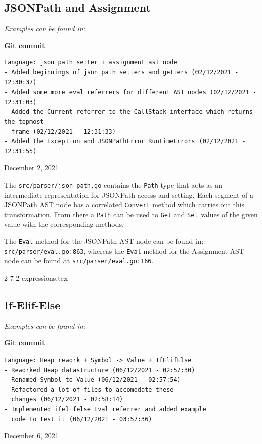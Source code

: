 \documentclass[]{full}
\theoremstyle{definition}
\begin{document}
\subsection{JSONPath and Assignment}

\textit{Examples can be found in: }

\begin{center}
    \textbf{Git commit}
    \begin{verbatim}
Language: json path setter + assignment ast node
- Added beginnings of json path setters and getters (02/12/2021 - 12:30:37)
- Added some more eval referrers for different AST nodes (02/12/2021 - 12:31:03)
- Added the Current referrer to the CallStack interface which returns the topmost
  frame (02/12/2021 - 12:31:33)
- Added the Exception and JSONPathError RuntimeErrors (02/12/2021 - 12:31:55)
    \end{verbatim}
    \vspace{-1em}
    \tiny{December 2, 2021}
\end{center}

The \verb|src/parser/json_path.go| contains the \verb|Path| type that acts as an intermediate representation for JSONPath access and setting. Each segment of a JSONPath AST node has a correlated \verb|Convert| method which carries out this transformation. From there a \verb|Path| can be used to \verb|Get| and \verb|Set| values of the given value with the corresponding methods.

The \verb|Eval| method for the JSONPath AST node can be found in: \verb|src/parser/eval.go:863|, whereas the \verb|Eval| method for the Assignment AST node can be found at \verb|src/parser/eval.go:166|.

{2-7-2-expressions.tex}

\subsection{If-Elif-Else}

\textit{Examples can be found in: }

\begin{center}
    \textbf{Git commit}
    \begin{verbatim}
Language: Heap rework + Symbol -> Value + IfElifElse
- Reworked Heap datastructure (06/12/2021 - 02:57:30)
- Renamed Symbol to Value (06/12/2021 - 02:57:54)
- Refactored a lot of files to accomodate these 
  changes (06/12/2021 - 02:58:14)
- Implemented ifelifelse Eval referrer and added example
  code to test it (06/12/2021 - 03:57:36)
    \end{verbatim}
    \vspace{-1em}
    \tiny{December 6, 2021}
\end{center}
\end{document}
